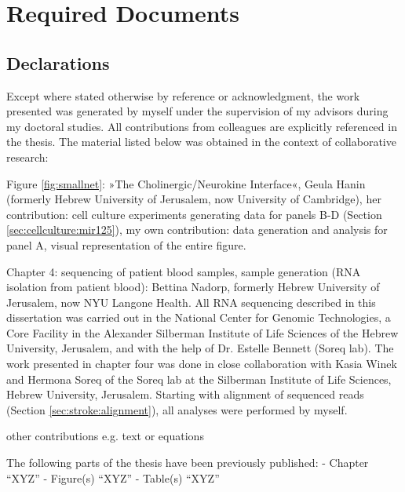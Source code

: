 \chapter{Required Documents} 
\label{appendix:req-doc}

\section{Declarations}
Except where stated otherwise by reference or acknowledgment, the work presented was generated by myself under the supervision of my advisors during my doctoral studies. All contributions from colleagues are explicitly referenced in the thesis. The material listed below was obtained in the context of collaborative research:

Figure \ref{fig:smallnet}: »The Cholinergic/Neurokine Interface«, Geula Hanin (formerly Hebrew University of Jerusalem, now University of Cambridge), her contribution: cell culture experiments generating data for panels B-D (Section \ref{sec:cellculture:mir125}), my own contribution: data generation and analysis for panel A, visual representation of the entire figure.

Chapter 4: sequencing of patient blood samples, sample generation (RNA isolation from patient blood): Bettina Nadorp, formerly Hebrew University of Jerusalem, now NYU Langone Health. All RNA sequencing described in this dissertation was carried out in the National Center for Genomic Technologies, a Core Facility in the Alexander Silberman Institute of Life Sciences of the Hebrew University, Jerusalem, and with the help of Dr. Estelle Bennett (Soreq lab). The work presented in chapter four was done in close collaboration with Kasia Winek and Hermona Soreq of the Soreq lab at the Silberman Institute of Life Sciences, Hebrew University, Jerusalem. Starting with alignment of sequenced reads (Section \ref{sec:stroke:alignment}), all analyses were performed by myself.

other contributions e.g. text or equations

The following parts of the thesis have been previously published:
- Chapter “XYZ”
- Figure(s) “XYZ”
- Table(s) “XYZ”

\newpage

